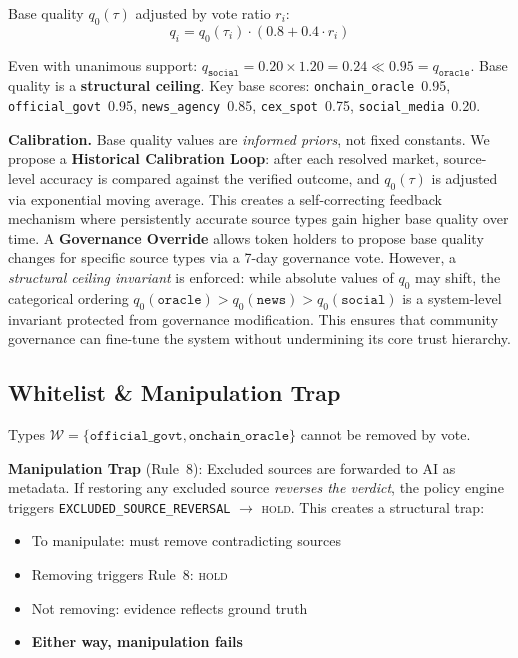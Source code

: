 \documentclass[11pt,a4paper,twocolumn]{article}
\begin{document}
Base quality $q_0(\tau)$ adjusted by vote ratio $r_i$:
\begin{equation}
    q_i = q_0(\tau_i) \cdot (0.8 + 0.4 \cdot r_i)
    \label{eq:qadj}
\end{equation}

Even with unanimous support: $q_{\texttt{social}} = 0.20 \times 1.20 = 0.24 \ll 0.95 = q_{\texttt{oracle}}$. Base quality is a \textbf{structural ceiling}. Key base scores: \texttt{onchain\_oracle}~0.95, \texttt{official\_govt}~0.95, \texttt{news\_agency}~0.85, \texttt{cex\_spot}~0.75, \texttt{social\_media}~0.20.

\textbf{Calibration.} Base quality values are \emph{informed priors}, not fixed constants. We propose a \textbf{Historical Calibration Loop}: after each resolved market, source-level accuracy is compared against the verified outcome, and $q_0(\tau)$ is adjusted via exponential moving average. This creates a self-correcting feedback mechanism where persistently accurate source types gain higher base quality over time. A \textbf{Governance Override} allows token holders to propose base quality changes for specific source types via a 7-day governance vote. However, a \emph{structural ceiling invariant} is enforced: while absolute values of $q_0$ may shift, the categorical ordering $q_0(\texttt{oracle}) > q_0(\texttt{news}) > q_0(\texttt{social})$ is a system-level invariant protected from governance modification. This ensures that community governance can fine-tune the system without undermining its core trust hierarchy.

\subsection{Whitelist \& Manipulation Trap}

Types $\mathcal{W} = \{\texttt{official\_govt}, \texttt{onchain\_oracle}\}$ cannot be removed by vote.

\textbf{Manipulation Trap} (Rule~8): Excluded sources are forwarded to AI as metadata. If restoring any excluded source \emph{reverses the verdict}, the policy engine triggers \texttt{EXCLUDED\_SOURCE\_REVERSAL} $\to$ \textsc{hold}. This creates a structural trap:

\begin{itemize}[nosep]
    \item To manipulate: must remove contradicting sources
    \item Removing triggers Rule~8: \textsc{hold}
    \item Not removing: evidence reflects ground truth
    \item \textbf{Either way, manipulation fails}
\end{itemize}
\end{document}
